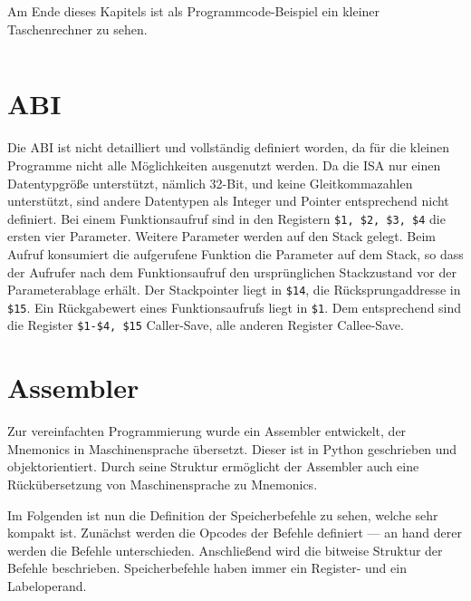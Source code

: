 
Am Ende dieses Kapitels ist als Programmcode-Beispiel ein kleiner Taschenrechner zu sehen.

\newpage
\begin{center}
\begin{multicols}{3}
\inputminted{nasm}{calc.s}
\end{multicols}
\end{center}

\newpage
\section{ABI}
Die ABI ist nicht detailliert und vollständig definiert worden, da für die kleinen Programme nicht alle Möglichkeiten ausgenutzt werden.
Da die ISA nur einen Datentypgröße unterstützt, nämlich 32-Bit, und keine Gleitkommazahlen unterstützt, sind andere Datentypen als Integer und Pointer entsprechend nicht definiert.
Bei einem Funktionsaufruf sind in den Registern \texttt{\$1, \$2, \$3, \$4} die ersten vier Parameter.
Weitere Parameter werden auf den Stack gelegt.
Beim Aufruf konsumiert die aufgerufene Funktion die Parameter auf dem Stack,
so dass der Aufrufer nach dem Funktionsaufruf den ursprünglichen Stackzustand vor der Parameterablage erhält. 
Der Stackpointer liegt in \texttt{\$14}, die Rücksprungaddresse in \texttt{\$15}.
Ein Rückgabewert eines Funktionsaufrufs liegt in \texttt{\$1}.
Dem entsprechend sind die Register \texttt{\$1-\$4, \$15} Caller-Save, alle anderen Register Callee-Save.

\section{Assembler}
Zur vereinfachten Programmierung wurde ein Assembler entwickelt, der Mnemonics in Maschinensprache übersetzt.
Dieser ist in Python geschrieben und objektorientiert. Durch seine Struktur ermöglicht der Assembler auch eine Rückübersetzung von Maschinensprache zu Mnemonics.

Im Folgenden ist nun die Definition der Speicherbefehle zu sehen, welche sehr kompakt ist. Zunächst werden die Opcodes der Befehle definiert --- an hand derer werden die Befehle unterschieden. Anschließend wird die bitweise Struktur der Befehle beschrieben. Speicherbefehle haben immer ein Register- und ein Labeloperand.
\begin{center}
\inputminted{py}{../assembler/operations/memOperation.py}
\end{center}

